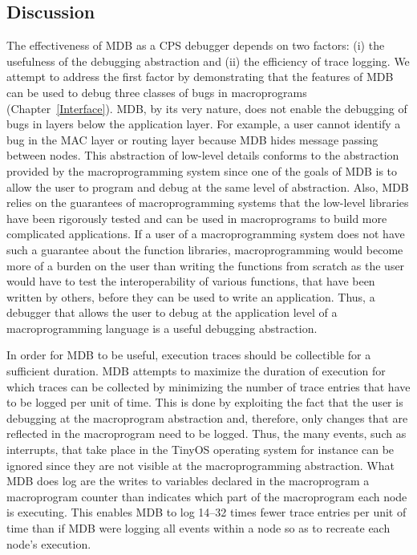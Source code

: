 \subsection{Discussion} \label{discussion} 
%
The effectiveness of MDB as a CPS debugger depends on two factors: (i) the
usefulness of the debugging abstraction and (ii) the efficiency of trace
logging. We attempt to address the first factor by demonstrating that the
features of MDB can be used to debug three classes of bugs in macroprograms
(Chapter~\ref{Interface}). MDB, by its very nature, does not enable the
debugging of bugs in layers below the application layer. For example, a user
cannot identify a bug in the MAC layer or routing layer because MDB hides
message passing between nodes. This abstraction of low-level details conforms to
the abstraction provided by the macroprogramming system since one of the goals
of MDB is to allow the user to program and debug at the same level of
abstraction. Also, MDB relies on the guarantees of macroprogramming systems that
the low-level libraries have been rigorously tested and can be used in
macroprograms to build more complicated applications. If a user of a
macroprogramming system does not have such a guarantee about the function
libraries, macroprogramming would become more of a burden on the user than
writing the functions from scratch as the user would have to test the
interoperability of various functions, that have been written by others, before
they can be used to write an application. Thus, a debugger that allows the user
to debug at the application level of a macroprogramming language is a useful
debugging abstraction.

In order for MDB to be useful, execution traces should be collectible for a
sufficient duration. MDB attempts to maximize the duration of execution for
which traces can be collected by minimizing the number of trace entries that
have to be logged per unit of time. This is done by exploiting the fact that the
user is debugging at the macroprogram abstraction and, therefore, only changes
that are reflected in the macroprogram need to be logged. Thus, the many events,
such as interrupts, that take place in the TinyOS operating system for instance
can be ignored since they are not visible at the macroprogramming
abstraction. What MDB does log are the writes to variables declared in the
macroprogram a macroprogram counter than indicates which part of the
macroprogram each node is executing. This enables MDB to log 14--32 times fewer
trace entries per unit of time than if MDB were logging all events within a node
so as to recreate each node's execution. 


